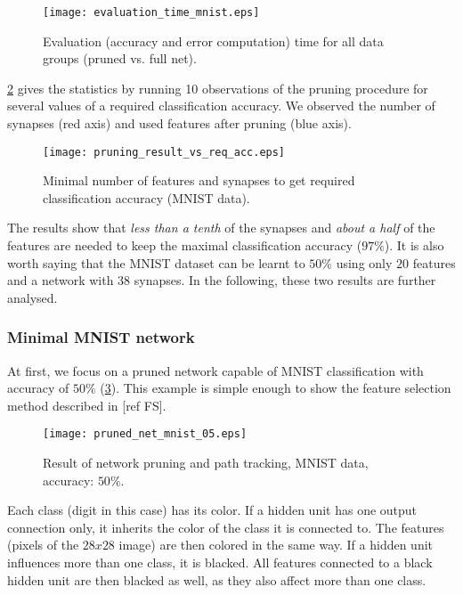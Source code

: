 \begin{figure}[H]
\centering
\texttt{[image: evaluation\_time\_mnist.eps]}
\caption{Evaluation (accuracy and error computation) time for all data groups (pruned vs. full net).}
\label{fig:examples:evaluation_time_mnist}
\end{figure}

 \cref{fig:examples:mnist_pruning_vs_req_acc} gives the statistics by running 10 observations of the pruning procedure for several values of a required classification accuracy. We observed the number of synapses (red axis) and used features after pruning (blue axis).

\begin{figure}[H]
\centering
\texttt{[image: pruning\_result\_vs\_req\_acc.eps]}
\caption{Minimal number of features and synapses to get required classification accuracy (MNIST data).}
\label{fig:examples:mnist_pruning_vs_req_acc}
\end{figure}

The results show that \textit{less than a tenth} of the synapses and \textit{about a half} of the features are needed to keep the maximal classification accuracy ($ 97\% $). It is also worth saying that the MNIST dataset can be learnt to $ 50\% $ using only $ 20 $ features and a network with $ 38 $ synapses. In the following, these two results are further analysed.

\subsubsection*{Minimal MNIST network}
At first, we focus on a pruned network capable of MNIST classification with accuracy of $ 50\% $ (\cref{fig:examples:pruned_net_mnist_05}). This example is simple enough to show the feature selection method described in [ref FS].

\begin{figure}[H]
\centering
\texttt{[image: pruned\_net\_mnist\_05.eps]}
\caption{Result of network pruning and path tracking, MNIST data, accuracy: $ 50\% $.}
\label{fig:examples:pruned_net_mnist_05}
\end{figure}

Each class (digit in this case) has its color. If a hidden unit has one output connection only, it inherits the color of the class it is connected to. The features (pixels of the $ 28x28 $ image) are then colored in the same way. If a hidden unit influences more than one class, it is blacked. All features connected to a black hidden unit are then blacked as well, as they also affect more than one class.

